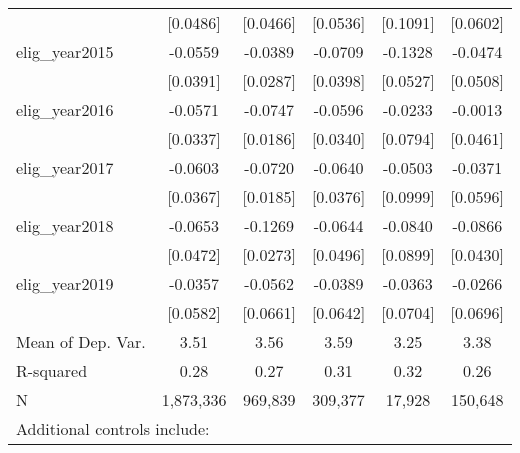 \begin{table}[htbp]
\begin{tabular}{l*{5}{c}}
                    &    [0.0486]         &    [0.0466]         &    [0.0536]         &    [0.1091]         &    [0.0602]         \\
\addlinespace
elig\_year2015       &     -0.0559         &     -0.0389         &     -0.0709\sym{*}  &     -0.1328\sym{**} &     -0.0474         \\
                    &    [0.0391]         &    [0.0287]         &    [0.0398]         &    [0.0527]         &    [0.0508]         \\
\addlinespace
elig\_year2016       &     -0.0571\sym{*}  &     -0.0747\sym{***}&     -0.0596\sym{*}  &     -0.0233         &     -0.0013         \\
                    &    [0.0337]         &    [0.0186]         &    [0.0340]         &    [0.0794]         &    [0.0461]         \\
\addlinespace
elig\_year2017       &     -0.0603         &     -0.0720\sym{***}&     -0.0640\sym{*}  &     -0.0503         &     -0.0371         \\
                    &    [0.0367]         &    [0.0185]         &    [0.0376]         &    [0.0999]         &    [0.0596]         \\
\addlinespace
elig\_year2018       &     -0.0653         &     -0.1269\sym{***}&     -0.0644         &     -0.0840         &     -0.0866\sym{**} \\
                    &    [0.0472]         &    [0.0273]         &    [0.0496]         &    [0.0899]         &    [0.0430]         \\
\addlinespace
elig\_year2019       &     -0.0357         &     -0.0562         &     -0.0389         &     -0.0363         &     -0.0266         \\
                    &    [0.0582]         &    [0.0661]         &    [0.0642]         &    [0.0704]         &    [0.0696]         \\
\midrule
Mean of Dep. Var.   &        3.51         &        3.56         &        3.59         &        3.25         &        3.38         \\
R-squared           &        0.28         &        0.27         &        0.31         &        0.32         &        0.26         \\
N                   &   1,873,336         &     969,839         &     309,377         &      17,928         &     150,648         \\
\bottomrule
\multicolumn{6}{l}{\footnotesize Additional controls include:}\\

\end{tabular}
\end{table}
